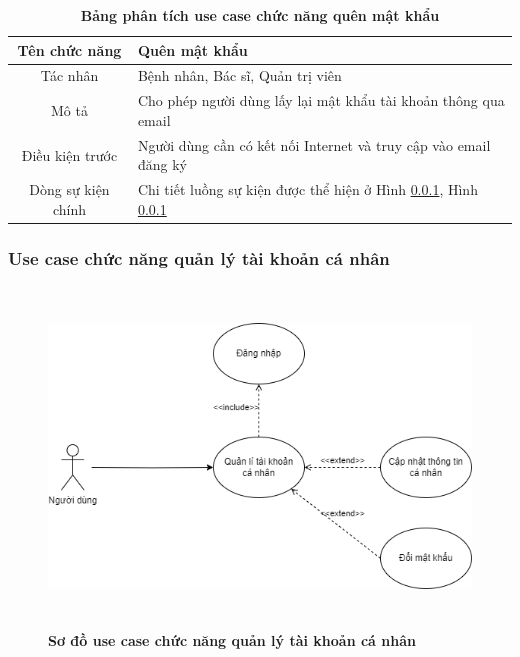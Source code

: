   \begin{table}[H]
    \caption{\bfseries \fontsize{12pt}{0pt}\selectfont Bảng phân tích use case chức năng quên mật khẩu}
    \centering
    \begin{tabularx}{0.9\textwidth}{|c|X|}
      \hline
      \textbf{Tên chức năng} & \textbf{Quên mật khẩu} \\
      \hline
      Tác nhân & Bệnh nhân, Bác sĩ, Quản trị viên \\
      \hline
      Mô tả & Cho phép người dùng lấy lại mật khẩu tài khoản thông qua email
       \\
      \hline
      Điều kiện trước & Người dùng cần có kết nối Internet và truy cập vào email đăng ký \\
      \hline
      Dòng sự kiện chính & 
        Chi tiết luồng sự kiện được thể hiện ở Hình \ref{}, Hình \ref{} 
        \\
      \hline
    \end{tabularx}
  \end{table}

\subsubsection{Use case chức năng quản lý tài khoản cá nhân}
  \begin{figure}[H]
    \centering
    \includegraphics[width=14.8cm,height=9cm]{Images/use_case/use_case_manage_info.png}
    \caption[Sơ đồ use case chức năng quản lý tài khoản cá nhân]{\bfseries \fontsize{12pt}{0pt}
    \selectfont Sơ đồ use case chức năng quản lý tài khoản cá nhân}
    \label{use_case_manage_info} %
  \end{figure}

